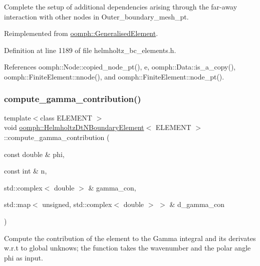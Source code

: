 Complete the setup of additional dependencies arising through the far-\/away interaction with other nodes in Outer\+\_\+boundary\+\_\+mesh\+\_\+pt. 



Reimplemented from \hyperlink{classoomph_1_1GeneralisedElement_af03c43b9df873659a6ca91e39566256e}{oomph\+::\+Generalised\+Element}.



Definition at line 1189 of file helmholtz\+\_\+bc\+\_\+elements.\+h.



References oomph\+::\+Node\+::copied\+\_\+node\+\_\+pt(), e, oomph\+::\+Data\+::is\+\_\+a\+\_\+copy(), oomph\+::\+Finite\+Element\+::nnode(), and oomph\+::\+Finite\+Element\+::node\+\_\+pt().

\mbox{\label{classoomph_1_1HelmholtzDtNBoundaryElement_a5393d290b291de8434ead6cce873a376}} 
\subsubsection{\texorpdfstring{compute\+\_\+gamma\+\_\+contribution()}{compute\_gamma\_contribution()}}
{\footnotesize\ttfamily template$<$class E\+L\+E\+M\+E\+NT $>$ \\
void \hyperlink{classoomph_1_1HelmholtzDtNBoundaryElement}{oomph\+::\+Helmholtz\+Dt\+N\+Boundary\+Element}$<$ E\+L\+E\+M\+E\+NT $>$\+::compute\+\_\+gamma\+\_\+contribution (\begin{DoxyParamCaption}\item[{const double \&}]{phi,  }\item[{const int \&}]{n,  }\item[{std\+::complex$<$ double $>$ \&}]{gamma\+\_\+con,  }\item[{std\+::map$<$ unsigned, std\+::complex$<$ double $>$ $>$ \&}]{d\+\_\+gamma\+\_\+con }\end{DoxyParamCaption})}



Compute the contribution of the element to the Gamma integral and its derivates w.\+r.\+t to global unknows; the function takes the wavenumber and the polar angle phi as input. 

